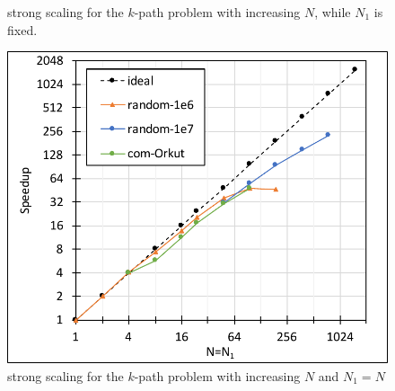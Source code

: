 \begin{figure}[!htb]
\begin{minipage}{0.32\textwidth}
        \caption{\ouralgo{} strong scaling for the $k$-path problem with increasing $N$, while $N_1$ is fixed.}
        \label{fig-perf-kpath-1mil-speedup-N1fixed.pdf}
    \end{minipage}
    \hspace{0mm}
    \begin{minipage}{0.32\textwidth}
        \centering        
        \includegraphics[width=1\columnwidth]{img/kpath-N1N/fig-perf-kpath-speedup-N=N1.pdf}
        \caption{\ouralgo{} strong scaling for the $k$-path problem with increasing $N$ and $N_1=N$}
        \label{fig:fig-perf-kpath-speedup-N=N1.pdf}
    \end{minipage}
\end{figure}

